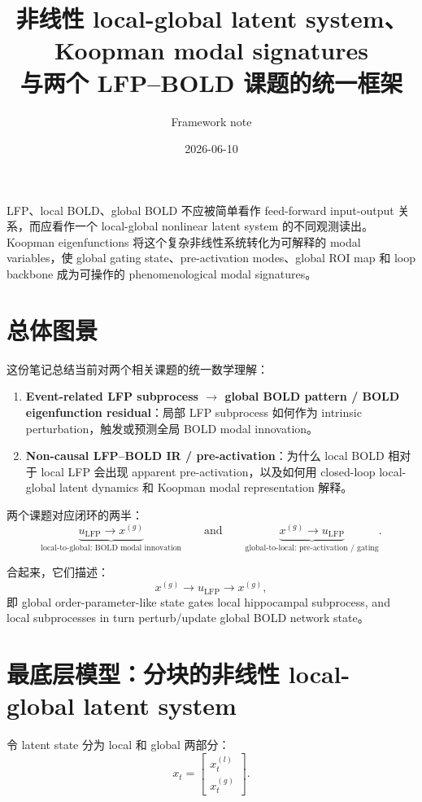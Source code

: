 \documentclass[11pt,a4paper]{ctexart}
\title{非线性 local-global latent system、Koopman modal signatures\\与两个 LFP--BOLD 课题的统一框架}
\author{Framework note}
\date{2026-06-10}
\begin{document}
\maketitle

\begin{tcolorbox}[colback=softblue,colframe=deepblue,title=核心观点]
LFP、local BOLD、global BOLD 不应被简单看作 feed-forward input-output 关系，而应看作一个 local-global nonlinear latent system 的不同观测读出。Koopman eigenfunctions 将这个复杂非线性系统转化为可解释的 modal variables，使 global gating state、pre-activation modes、global ROI map 和 loop backbone 成为可操作的 phenomenological modal signatures。
\end{tcolorbox}

\tableofcontents
\newpage

\section{总体图景}

这份笔记总结当前对两个相关课题的统一数学理解：
\begin{enumerate}
    \item \textbf{Event-related LFP subprocess $\to$ global BOLD pattern / BOLD eigenfunction residual}：局部 LFP subprocess 如何作为 intrinsic perturbation，触发或预测全局 BOLD modal innovation。
    \item \textbf{Non-causal LFP--BOLD IR / pre-activation}：为什么 local BOLD 相对于 local LFP 会出现 apparent pre-activation，以及如何用 closed-loop local-global latent dynamics 和 Koopman modal representation 解释。
\end{enumerate}

两个课题对应闭环的两半：
\[
\underbrace{u_{\mathrm{LFP}} \rightarrow x^{(g)}}_{\text{local-to-global: BOLD modal innovation}}
\qquad\text{and}\qquad
\underbrace{x^{(g)} \rightarrow u_{\mathrm{LFP}}}_{\text{global-to-local: pre-activation / gating}}.
\]

合起来，它们描述：
\[
x^{(g)} \rightarrow u_{\mathrm{LFP}} \rightarrow x^{(g)},
\]
即 global order-parameter-like state gates local hippocampal subprocess, and local subprocesses in turn perturb/update global BOLD network state。

\section{最底层模型：分块的非线性 local-global latent system}

令 latent state 分为 local 和 global 两部分：
\begin{equation}
    x_t =
    \begin{bmatrix}
    x_t^{(l)} \\
    x_t^{(g)}
    \end{bmatrix}.
\end{equation}
\end{document}
